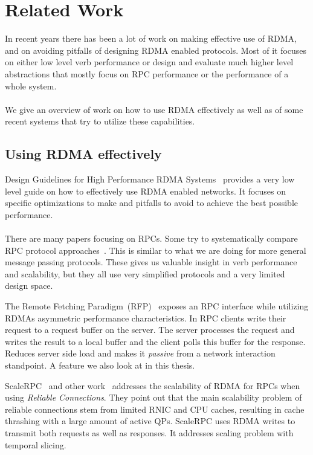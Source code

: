 \section{Related Work}

In recent years there has been a lot of work on making effective use of RDMA, and on avoiding pitfalls of designing  
RDMA enabled protocols. Most of it focuses on either low level verb performance or design and evaluate much higher level
abstractions that mostly focus on RPC performance or the performance of a whole system.

\paragraph{} We give an overview of work on how to use RDMA effectively as well as of 
some recent systems that try to utilize these
capabilities.

\subsection{Using RDMA effectively}

Design Guidelines for High Performance RDMA Systems~\cite{anuj-guide} provides a very low level guide on how to
effectively use RDMA enabled networks. It focuses on specific optimizations to make and pitfalls to avoid to achieve the 
best possible performance. 

\paragraph{} There are many papers focusing on RPCs. Some try to systematically  compare RPC protocol
approaches~\cite{ziegler2020rdma,Huang2019AnEO}. This is similar to what we are doing for more general 
message passing protocols. These gives us valuable insight in verb performance and scalability, but they all use very 
simplified protocols and a very limited design space.

The Remote Fetching Paradigm~(RFP)~\cite{rfp} exposes an RPC interface while utilizing RDMAs asymmetric performance 
characteristics. In RPC clients write their request to a request buffer on the server. The server processes the request
and writes the result to a local buffer and the client polls this buffer for the response. Reduces server side load and 
makes it \emph{passive} from a network interaction standpoint. A feature we also look at in this thesis.

ScaleRPC~\cite{scalerpc} and other work~\cite{fasst, herd, rfp} addresses the scalability of RDMA for RPCs when using 
\emph{Reliable Connections}. They point out that the main scalability problem of reliable connections stem from limited 
RNIC and CPU caches, resulting in cache thrashing with a large amount of active QPs. ScaleRPC uses RDMA writes to 
transmit both requests as well as responses. It addresses scaling problem with temporal slicing.



